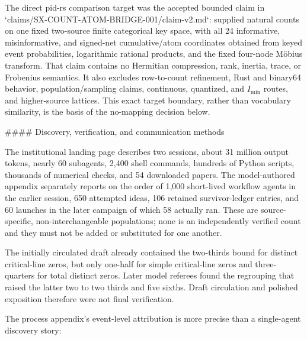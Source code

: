 \documentclass[11pt]{article}
\begin{document}
\begin{markdown}
The direct pid-rs comparison target was the accepted bounded claim in
`claims/SX-COUNT-ATOM-BRIDGE-001/claim-v2.md`:
supplied natural counts on one fixed two-source finite categorical key space, with all 24
informative, misinformative, and signed-net cumulative/atom coordinates obtained from keyed event
probabilities, logarithmic rational products, and the fixed four-node Möbius transform. That claim
contains no Hermitian compression, rank, inertia, trace, or Frobenius semantics. It also excludes
row-to-count refinement, Rust and binary64 behavior, population/sampling claims, continuous,
quantized, and $I_{\min}$ routes, and higher-source lattices. This exact target boundary, rather
than vocabulary similarity, is the basis of the no-mapping decision below.

#### Discovery, verification, and communication methods

The institutional landing page describes two sessions, about 31 million output tokens, nearly 60
subagents, 2,400 shell commands, hundreds of Python scripts, thousands of numerical checks, and 54
downloaded papers. The model-authored appendix separately reports on the order of 1,000 short-lived
workflow agents in the earlier session, 650 attempted ideas, 106 retained survivor-ledger entries,
and 60 launches in the later campaign of which 58 actually ran. These are source-specific,
non-interchangeable populations; none is an independently verified count and they must not be
added or substituted for one another.

The initially circulated draft already contained the two-thirds bound for distinct critical-line
zeros, but only one-half for simple critical-line zeros and three-quarters for total distinct zeros.
Later model referees found the regrouping that raised the latter two to two thirds and five sixths.
Draft circulation and polished exposition therefore were not final verification.

The process appendix's event-level attribution is more precise than a single-agent discovery
story:


\end{markdown}
\end{document}
